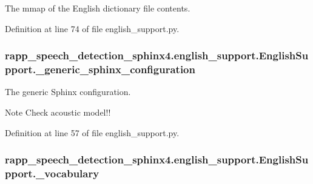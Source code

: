 The mmap of the English dictionary file contents. 



Definition at line 74 of file english\-\_\-support.\-py.

\hypertarget{classrapp__speech__detection__sphinx4_1_1english__support_1_1EnglishSupport_a3871c35fccf8b9c8ceb98a9763191132}{
\subsubsection[{\-\_\-generic\-\_\-sphinx\-\_\-configuration}]{\setlength{\rightskip}{0pt plus 5cm}rapp\-\_\-speech\-\_\-detection\-\_\-sphinx4.\-english\-\_\-support.\-English\-Support.\-\_\-generic\-\_\-sphinx\-\_\-configuration\hspace{0.3cm}{\ttfamily [private]}}}\label{classrapp__speech__detection__sphinx4_1_1english__support_1_1EnglishSupport_a3871c35fccf8b9c8ceb98a9763191132}


The generic Sphinx configuration. 

\begin{DoxyNote}{Note}
Check acoustic model!! 
\end{DoxyNote}


Definition at line 57 of file english\-\_\-support.\-py.

\hypertarget{classrapp__speech__detection__sphinx4_1_1english__support_1_1EnglishSupport_a9281d1138c5b2fa11d1e8f1899e81cbc}{
\subsubsection[{\-\_\-vocabulary}]{\setlength{\rightskip}{0pt plus 5cm}rapp\-\_\-speech\-\_\-detection\-\_\-sphinx4.\-english\-\_\-support.\-English\-Support.\-\_\-vocabulary\hspace{0.3cm}{\ttfamily [private]}}}\label{classrapp__speech__detection__sphinx4_1_1english__support_1_1EnglishSupport_a9281d1138c5b2fa11d1e8f1899e81cbc}


